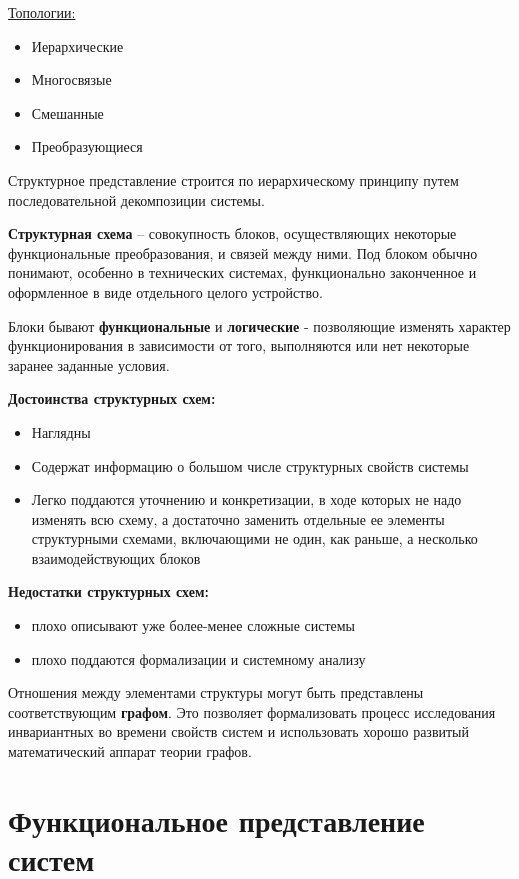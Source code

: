 \documentclass[a4paper]{article}
\begin{document}
	\underline{Топологии:}
\begin{itemize}
	\item Иерархические
	\item Многосвязые
	\item Смешанные
	\item Преобразующиеся
\end{itemize}
	
	Структурное представление строится по иерархическому принципу путем последовательной декомпозиции системы. 
	
	\textbf{Структурная схема} – совокупность блоков, осуществляющих некоторые функциональные преобразования, и связей между ними. Под блоком обычно понимают, особенно в технических системах, функционально законченное и оформленное в виде отдельного целого устройство.
	
	Блоки бывают \textbf{функциональные} и \textbf{логические} - позволяющие изменять характер функционирования в зависимости от того, выполняются или нет некоторые заранее заданные условия.
	
	\textbf{Достоинства структурных схем:}
	\begin{itemize}
		\item Наглядны
		\item Содержат информацию о большом числе структурных свойств системы
		\item Легко поддаются уточнению и конкретизации, в ходе которых не надо изменять всю схему, а достаточно заменить отдельные ее элементы структурными схемами, включающими не один, как раньше, а несколько взаимодействующих блоков
	\end{itemize}

 	\textbf{Недостатки структурных схем:}
 	\begin{itemize}
 		\item плохо описывают уже более-менее сложные системы
 		\item плохо поддаются формализации и системному анализу
 	\end{itemize}
 
 Отношения между элементами структуры могут быть представлены соответствующим \textbf{графом}. Это позволяет формализовать процесс исследования инвариантных во времени свойств систем и использовать хорошо развитый математический аппарат теории графов.
	
	\section{Функциональное представление систем}
	
\end{document}
